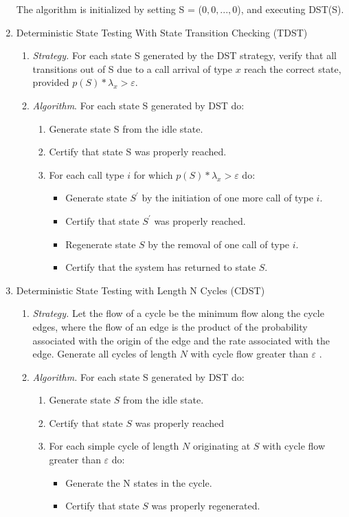 \documentclass[journal, twoside]{IEEEtran}
\begin{document}
\begin{enumerate}
    The algorithm is initialized by setting S = ($0, 0, . . . , 0$), and executing DST(S). 
    \item Deterministic State Testing With State Transition Checking (TDST)
    \begin{enumerate}
        \item \textit{Strategy.} For each state S generated by the DST strategy, verify that all transitions out of S due to a call arrival of type $x$ reach the correct state, provided $p(S) * \lambda_x >\varepsilon$. 
        \item \textit{Algorithm}. For each state S generated by DST do: 
        \begin{enumerate}
            \item  Generate state S from the idle state. 
            \item Certify that state S was properly reached.
            \item  For each call type $i$ for which $p(S) * \lambda_x >\varepsilon$ do:
            \begin{itemize}
                \item  Generate state $S^'$ by the initiation of one more call of type $i$. 
                \item Certify that state $S^'$ was properly reached.
                \item Regenerate state $S$ by the removal of one call of type $i$. 
                \item Certify that the system has returned to state $S$.
            \end{itemize}
        \end{enumerate}
    \end{enumerate}
    \item Deterministic State Testing with Length N Cycles (CDST)
    \begin{enumerate}
        \item \textit{Strategy. }Let the flow of a cycle be the minimum flow along the cycle edges, where the flow of an edge is the product of the probability associated with the origin of the edge and the rate associated with the edge. Generate all cycles of length $N$ with cycle flow greater than $\varepsilon$ .
        \item \textit{Algorithm.} For each state S generated by DST do: 
        \begin{enumerate}
            \item Generate state $S$ from the idle state.
            \item Certify that state $S$ was properly reached
            \item  For each simple cycle of length $N$ originating at $S$ with cycle flow greater than $\varepsilon$ do: 
            \begin{itemize}
                \item  Generate the N states in the cycle.
                \item  Certify that state $S$ was properly regenerated. 
            \end{itemize}
        \end{enumerate}
    \end{enumerate}
\end{enumerate}
\end{document}

